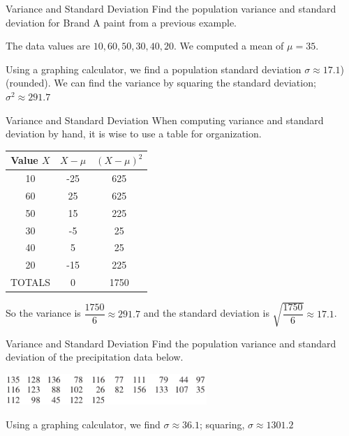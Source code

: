 \documentclass[t, aspectratio=169]{beamer}
\newcommand{\?}{\stackrel{?}{=}}
\begin{document}
	\begin{frame}{Variance and Standard Deviation}
		Find the population variance and standard deviation for Brand A paint from a previous example.
		
		The data values are $10, 60, 50, 30 , 40, 20$. We computed a mean of $\mu = 35$. \pause \vspace{32pt}
		
		Using a graphing calculator, we find a population standard deviation $\sigma \approx 17.1$) (rounded). We can find the variance by squaring the standard deviation; $\sigma^2 \approx 291.7$
	\end{frame}

	\begin{frame}{Variance and Standard Deviation}
		When computing variance and standard deviation by hand, it is wise to use a table for organization. \pause
		
		\begin{tabular}{|c|c|c|} \hline
			Value $X$ & $X - \mu$ & $(X - \mu)^2$ \\ \hline
			10 & -25 & 625 \\ \hline
			60 & 25 & 625 \\ \hline
			50 & 15 & 225 \\ \hline
			30 & -5 & 25 \\ \hline
			40 & 5 & 25 \\ \hline
			20 & -15 & 225 \\ \hline
			TOTALS & 0 & 1750 \\ \hline
		\end{tabular} \pause
	
		So the variance is $\dfrac{1750}{6} \approx 291.7$ and the standard deviation is $\sqrt{\dfrac{1750}{6}} \approx 17.1$.
	\end{frame}

	\begin{frame}{Variance and Standard Deviation}
		Find the population variance and standard deviation of the precipitation data below.
		
		\includegraphics[width=3in]{precip-data.png} \vspace{32pt} \pause
		
		Using a graphing calculator, we find $\sigma \approx 36.1$; squaring, $\sigma \approx 1301.2$
	\end{frame}
\end{document}
